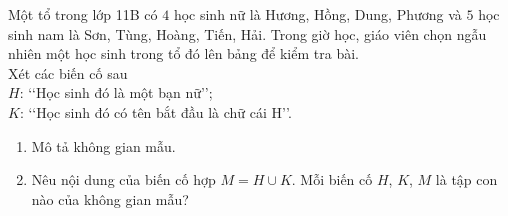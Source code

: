 \begin{bt}[Mức 1]%
	Một tổ trong lớp 11B có $4$ học sinh nữ là Hương, Hồng, Dung, Phương và $5$ học sinh nam là Sơn, Tùng, Hoàng, Tiến, Hải. Trong giờ học, giáo viên chọn ngẫu nhiên một học sinh trong tổ đó lên bảng để kiểm tra bài.\\
	Xét các biến cố sau\\
	$H$: \lq\lq Học sinh đó là một bạn nữ\rq\rq;\\
	$K$: \lq\lq Học sinh đó có tên bắt đầu là chữ cái $\mathrm{H}$\rq\rq.
	\begin{enumerate}
		\item Mô tả không gian mẫu.
		\item Nêu nội dung của biến cố hợp $M = H \cup K$. Mỗi biến cố $H$, $K$, $M$ là tập con nào của không gian mẫu?
	\end{enumerate}
\end{bt}

